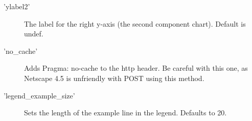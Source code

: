 \begin{description}
\item['ylabel2']The label for the right y-axis (the second component chart).  Default is undef.
\item['no\_cache']Adds Pragma: no-cache to the http header. Be careful with this one, as Netscape 4.5 is unfriendly with POST using this method.
\item['legend\_example\_size'] Sets the length of the example line in the legend. Defaults to 20.
\end{description}

 
